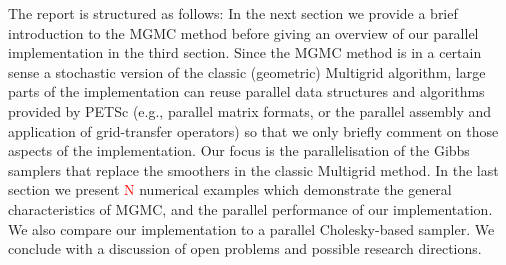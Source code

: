 \documentclass[
fontsize=11pt,
paper=a4,
numbers=noenddot
]{scrartcl}
\begin{document}

The report is structured as follows: In the next section we provide a brief introduction to the MGMC method before giving an overview of our parallel implementation in the third section. Since the MGMC method is in a certain sense a stochastic version of the classic (geometric) Multigrid algorithm, large parts of the implementation can reuse parallel data structures and algorithms provided by PETSc (e.g., parallel matrix formats, or the parallel assembly and application of grid-transfer operators) so that we only briefly comment on those aspects of the implementation. Our focus is the parallelisation of the Gibbs samplers that replace the smoothers in the classic Multigrid method. In the last section we present \textcolor{red}{N} numerical examples which demonstrate the general characteristics of MGMC, and the parallel performance of our implementation. We also compare our implementation to a parallel Cholesky-based sampler. We conclude with a discussion of open problems and possible research directions.
\end{document}

